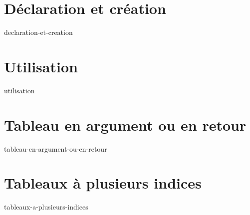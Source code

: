 \section{Déclaration et création}
    {declaration-et-creation}
\section{Utilisation}
    {utilisation}
\section{Tableau en argument ou en retour}
    {tableau-en-argument-ou-en-retour}
\section{Tableaux à plusieurs indices}
    {tableaux-a-plusieurs-indices}
